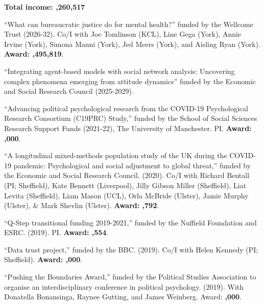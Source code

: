 \documentclass[12pt]{article}
\renewcommand{\section}[1]{\pagebreak[3]%
    \vspace{1.3\baselineskip}%
    \phantomsection\addcontentsline{toc}{section}{#1}%
    \noindent\llap{\scshape\smash{\parbox[t]{\marginparwidth}{\hyphenpenalty=10000\raggedright #1}}}%
    \vspace{-\baselineskip}\par}
\newcommand{\halfblankline}{\quad\vspace{-0.5\baselineskip}\pagebreak[3]}
\begin{document}
\halfblankline

\section{Funding}

\begin{bibsection}
	\item \textbf{Total income: ,260,517}
	
		\item ``What can bureaucratic justice do for mental health?'' funded by the Wellcome Trust (2026-32). Co\-/I with Joe Tomlinson (KCL), Line Gega (York), Annie Irvine (York), Simona Manni (York), Jed Meers (York), and Aisling Ryan (York). \textbf{Award: ,495,819}. 
		
		\item ``Integrating agent-based models with social 
		network analysis: Uncovering complex phenomena 
		emerging from attitude dynamics'' funded by the 
		Economic and Social Research Council (2025-2029).
	
	\item ``Advancing political psychological research from the COVID-19 Psychological Research Consortium (C19PRC) Study,'' funded by the School of Social Sciences Research Support Funds (2021-22), The University of Manchester. PI. \textbf{Award: ,000}. 

\item ``A longitudinal mixed-methods population study of the UK during the COVID-19 pandemic: Psychological and social adjustment to global threat,'' funded by the Economic and Social Research Council. (2020). Co\-/I with Richard Bentall (PI; Sheffield), Kate Bennett (Liverpool), Jilly Gibson Miller (Sheffield), Liat Levita (Sheffield), Liam Mason (UCL), Orla McBride (Ulster), Jamie Murphy (Ulster), \& Mark Shevlin (Ulster). \textbf{Award: ,792}. 

	\item ``Q-Step transitional funding 2019-2021,'' funded by the Nuffield Foundation and ESRC. (2019). PI. \textbf{Award: ,554}.

	\item ``Data trust project,'' funded by the BBC. (2019). Co\-/I with 
	Helen Kennedy (PI; Sheffield). \textbf{Award: ,000}. 
	
	    \item ``Pushing the Boundaries Award,'' funded by the Political Studies Association to organise an interdisciplinary conference in political psychology. (2019). With Donatella Bonansinga, Raynee Gutting, and James Weinberg. Award: \textbf{,000}. 


\end{bibsection}
\end{document}
